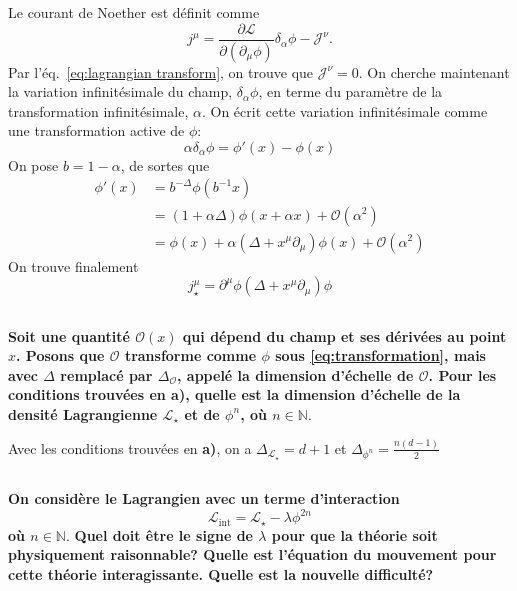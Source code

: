 \documentclass{article}
\numberwithin{equation}{section}
\theoremstyle{solution}
\begin{document}
Le courant de Noether est définit comme
\begin{equation}
        j^{\mu} = \frac{\partial \mathcal{L}}{\partial (\partial_{\mu}\phi)} \delta_\alpha  \phi  - \mathcal{J}^{\nu}.
\end{equation} 
Par l'éq.~\eqref{eq:lagrangian transform}, on trouve que $\mathcal{J}^{\nu} = 0$. On cherche maintenant la variation infinitésimale 
du champ, $\delta_{\alpha} \phi$, en terme du paramètre de la transformation infinitésimale, $\alpha$. On écrit cette variation 
infinitésimale comme une transformation active de $\phi$:
\begin{equation}
       \alpha\delta_\alpha \phi = \phi'(x) - \phi(x) 
\end{equation} 
On pose $b = 1 - \alpha$, de sortes que
\begin{align*}
        \phi'(x) &= b^{-\Delta}\phi(b^{-1}x) \\
              &= (1 + \alpha\Delta) \phi(x + \alpha x) + \mathcal{O}(\alpha^{2}) \\
              &= \phi(x) + \alpha(\Delta + x^{\mu}\partial_{\mu})\phi(x) + \mathcal{O}(\alpha^{2})
\end{align*}
On trouve finalement
\begin{equation}\label{eq:Noether current}
        \boxed{j^{\mu}_\star = \partial^{\mu} \phi(\Delta + x^{\mu}\partial_{\mu})\phi }
\end{equation} 

\subsection{}
\textbf{Soit une quantité $\mathcal{O}(x)$ qui dépend du champ et ses dérivées au point $x$. Posons que $\mathcal{O}$ 
transforme comme $\phi$ sous \eqref{eq:transformation}, mais avec $\Delta$ remplacé par $\Delta_\mathcal{O}$, appelé la dimension d’échelle
de $\mathcal{O}$. Pour les conditions trouvées en a), quelle est la dimension d’échelle de la densité
Lagrangienne $\mathcal{L}_{\star}$ et de $\phi^{n}$, où $n \in \mathbb{N}$}.
\vspace{2ex}

Avec les conditions trouvées en \textbf{a)}, on a $\boxed{\Delta_{\mathcal{L}_\star} = d+1}$ et $\boxed{\Delta_{\phi^{n}} = \frac{n(d-1)}{2}}$

\subsection{}
\textbf{On considère le Lagrangien avec un terme d'interaction}
\begin{equation}\label{eq:Lagrangien2c}
       \mathcal{L}_{\mathrm{int}} = \mathcal{L}_{\star} - \lambda \phi^{2n} 
\end{equation} 
\textbf{où $n \in \mathbb{N}$}.
\textbf{Quel doit être le signe de $\lambda$ pour que la théorie soit physiquement 
raisonnable? Quelle est l’équation du mouvement pour cette théorie interagissante. Quelle est la nouvelle difficulté?}
\end{document}
